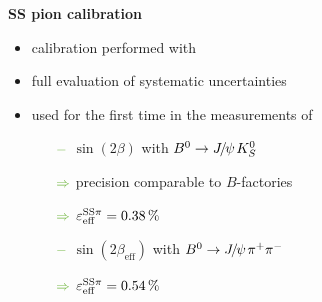 {\begin{minipage}{0.474\boxwidth}
\textbf{SS pion calibration}
\vspace{-0.1em}
\begin{itemize}
\setlength\itemsep{0.01em}
\item calibration performed with \BdToJPsiKst
\item full evaluation of systematic uncertainties 
\item used for the first time in the measurements of
\begin{itemize}
\setlength{\itemindent}{-.11in}
\item[${\color{tu_gruen}-}$] $\sin(2\beta)$ with $\Bd \rightarrow \jpsi K_S^0$
\setlength{\itemindent}{.05in}
\item[${\color{tu_gruen}\Rightarrow}$] precision comparable to $B$-factories
\item[${\color{tu_gruen}\Rightarrow}$] $\varepsilon_{\text{eff}}^{\text{SS}\pi} = 0.38\,\%$
\setlength{\itemindent}{-.11in}
\item[${\color{tu_gruen}-}$] $\sin(2\beta_{\text{eff}})$ with $\Bd \rightarrow \jpsi \pi^+ \pi^-$
\setlength{\itemindent}{.05in}
\item[${\color{tu_gruen}\Rightarrow}$] $\varepsilon_{\text{eff}}^{\text{SS}\pi} = 0.54\,\%$
\end{itemize}




\end{itemize}
\end{minipage}}
